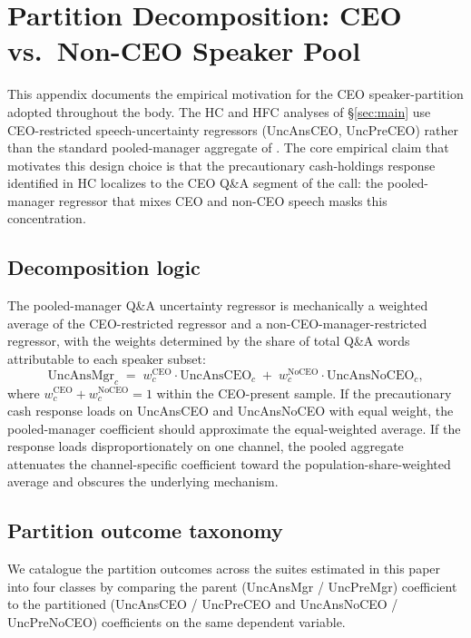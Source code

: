 
\section{Partition Decomposition: CEO vs.\ Non-CEO Speaker Pool}
\label{app:partition}

This appendix documents the empirical motivation for the CEO speaker-partition adopted throughout the body. The HC and HFC analyses of \S\ref{sec:main} use CEO-restricted speech-uncertainty regressors (UncAnsCEO, UncPreCEO) rather than the standard pooled-manager aggregate of . The core empirical claim that motivates this design choice is that the precautionary cash-holdings response identified in HC localizes to the CEO Q\&A segment of the call: the pooled-manager regressor that mixes CEO and non-CEO speech masks this concentration.

\subsection{Decomposition logic}

The pooled-manager Q\&A uncertainty regressor is mechanically a weighted average of the CEO-restricted regressor and a non-CEO-manager-restricted regressor, with the weights determined by the share of total Q\&A words attributable to each speaker subset:
\begin{equation*}
\text{UncAnsMgr}_c \;=\; w^{\text{CEO}}_c \cdot \text{UncAnsCEO}_c \;+\; w^{\text{NoCEO}}_c \cdot \text{UncAnsNoCEO}_c,
\end{equation*}
where $w^{\text{CEO}}_c + w^{\text{NoCEO}}_c = 1$ within the CEO-present sample. If the precautionary cash response loads on UncAnsCEO and UncAnsNoCEO with equal weight, the pooled-manager coefficient should approximate the equal-weighted average. If the response loads disproportionately on one channel, the pooled aggregate attenuates the channel-specific coefficient toward the population-share-weighted average and obscures the underlying mechanism.

\subsection{Partition outcome taxonomy}

We catalogue the partition outcomes across the suites estimated in this paper into four classes by comparing the parent (UncAnsMgr / UncPreMgr) coefficient to the partitioned (UncAnsCEO / UncPreCEO and UncAnsNoCEO / UncPreNoCEO) coefficients on the same dependent variable.

